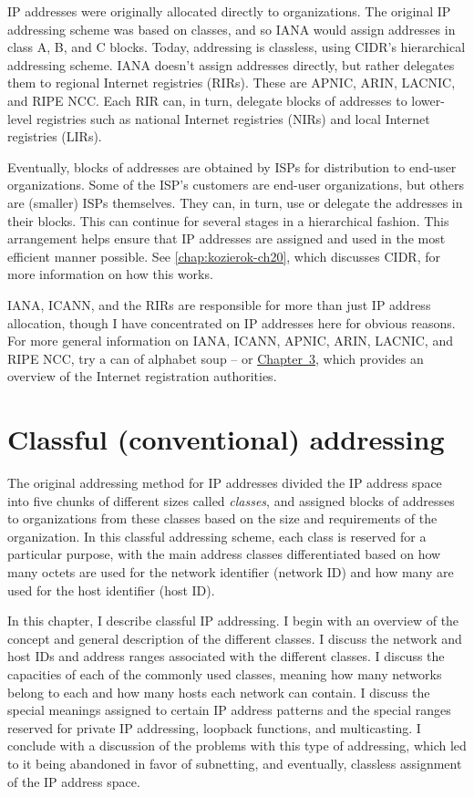 \documentclass[b5paper,11pt]{memoir}
\begin{document}
IP addresses were originally allocated directly to organizations. The
original IP addressing scheme was based on classes, and so IANA would
assign addresses in class A, B, and C blocks. Today, addressing is
classless, using CIDR's hierarchical addressing scheme. IANA doesn't
assign addresses directly, but rather delegates them to regional
Internet registries (RIRs). These are APNIC, ARIN, LACNIC, and RIPE NCC.
Each RIR can, in turn, delegate blocks of addresses to lower-level
registries such as national Internet registries (NIRs) and local
Internet registries (LIRs).

Eventually, blocks of addresses are obtained by ISPs for distribution to
end-user organizations. Some of the ISP's customers are end-user
organizations, but others are (smaller) ISPs themselves. They can, in
turn, use or delegate the addresses in their blocks. This can continue
for several stages in a hierarchical fashion. This arrangement helps
ensure that IP addresses are assigned and used in the most efficient
manner possible. See \vref{chap:kozierok-ch20}, which
discusses CIDR, for more information on how this works.

IANA, ICANN, and the RIRs are responsible for more than just IP address
allocation, though I have concentrated on IP addresses here for obvious
reasons. For more general information on IANA, ICANN, APNIC, ARIN,
LACNIC, and RIPE NCC, try a can of alphabet soup -- or \protect\hyperlink{ch03.html}{Chapter~3}, which provides an overview of the Internet registration authorities.





\chapter{Classful (conventional) addressing}
\label{chap:kozierok-ch17}

The original addressing method for IP addresses divided the IP address
space into five chunks of different sizes called {\emph{classes}}, and
assigned blocks of addresses to organizations from these classes based
on the size and requirements of the organization. In this classful
addressing scheme, each class is reserved for a particular purpose, with
the main address classes differentiated based on how many octets are
used for the network identifier (network ID) and how many are used for
the host identifier (host ID).

In this chapter, I describe classful IP addressing. I begin with an
overview of the concept and general description of the different
classes. I discuss the network and host IDs and address ranges
associated with the different classes. I discuss the capacities of each
of the commonly used classes, meaning how many networks belong to each
and how many hosts each network can contain. I discuss the special
meanings assigned to certain IP address patterns and the special ranges
reserved for private IP addressing, loopback functions, and
multicasting. I conclude with a discussion of the problems with this
type of addressing, which led to it being abandoned in favor of
subnetting, and eventually, classless assignment of the
\protect\hypertarget{ch17.htmlux5cux23idx-CHP-17-0676}{}{}IP address
space.
\end{document}
